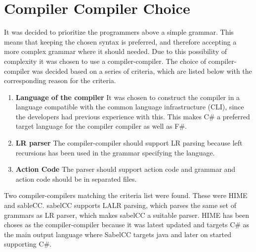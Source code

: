 \section{Compiler Compiler Choice}
\label{sec:compiler_compiler_choice}

It was decided to prioritize the programmers above a simple grammar. This means that keeping the chosen syntax is preferred, and therefore accepting a more complex grammar where it should needed. Due to this possibility of complexity it was chosen to use a compiler-compiler. The choice of compiler-compiler was decided based on a series of criteria, which are listed below with the corresponding reason for the criteria.

\begin{enumerate}
\item \textbf{Language of the compiler} It was chosen to construct the compiler in a language compatible with the common language infrastructure (CLI), since the developers had previous experience with this. This makes C\# a preferred target language for the compiler compiler as well as F\#.

\item \textbf{LR parser} The compiler-compiler should support LR parsing because left recursions has been used in the grammar specifying the language.\\

\item \textbf{Action Code} The parser should support action code and grammar and action code should be in separated files.\\

\end{enumerate}

Two compiler-compilers matching the criteria list were found. These were HIME and sableCC. sabelCC supports LALR parsing, which parses the same set of grammars as LR parser, which makes sabelCC a suitable parser. HIME has been choses as the compiler-compiler because it was latest updated and targets C\# as the main output language where SabelCC targets java and later on started supporting C\#.
